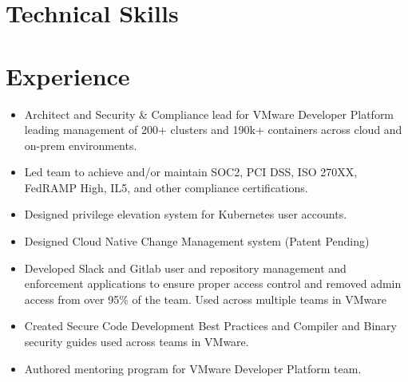 \documentclass[10pt,a4paper,roman]{moderncv} %
\begin{document}


\makecvtitle %


\section{Technical Skills}




\section{Experience}
{
\begin{itemize}
\item Architect and Security \& Compliance lead for VMware Developer Platform leading management of 200+ clusters and 190k+ containers across cloud and on-prem environments.
\item Led team to achieve and/or maintain SOC2, PCI DSS, ISO 270XX, FedRAMP High, IL5, and other compliance certifications.
\item Designed privilege elevation system for Kubernetes user accounts.
\item Designed Cloud Native Change Management system (Patent Pending)
\item Developed Slack and Gitlab user and repository management and enforcement applications to ensure proper access control and removed admin access from over 95\% of the team. Used across multiple teams in VMware
\item Created Secure Code Development Best Practices and Compiler and Binary security guides used across teams in VMware.
\item Authored mentoring program for VMware Developer Platform team.
\end{itemize}
}
\end{document}
